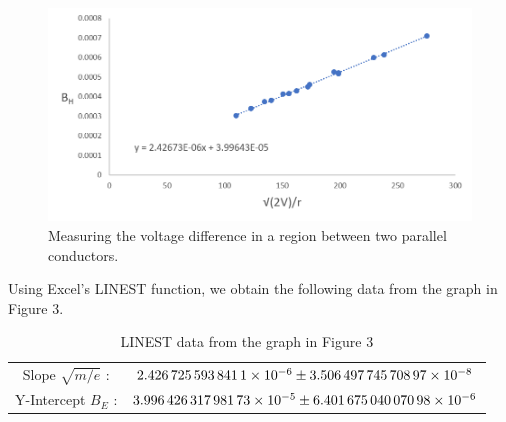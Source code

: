 \documentclass[letterpaper]{article}
\begin{document}
\begin{figure}[H]
  \centering
  \includegraphics[width=\textwidth]{chart1.png}
  \caption{Measuring the voltage difference in a region between two parallel conductors.}
\end{figure}

\newpage
\noindent Using Excel's LINEST function, we obtain the following data from the graph in Figure 3.
\begin{table}[H]
\centering
\begin{tabular}{cc}
  Slope $\sqrt{m/e}$ : &  $\num{2.4267255938411E-06}\pm \num{3.50649774570897E-08}$ \\
  Y-Intercept $B_E$   :&  $\num{3.99642631798173E-05}\pm \num{6.40167504007098E-06}$ \\
\end{tabular}
\caption{LINEST data from the graph in Figure 3}
\end{table}
\end{document}
